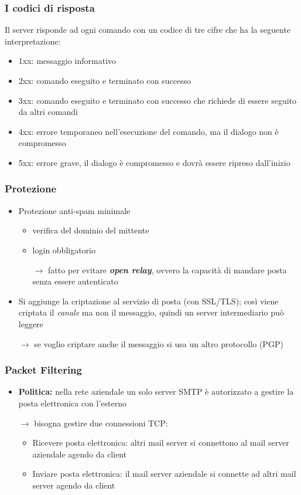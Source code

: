\subsubsection{I codici di risposta}
Il server risponde ad ogni comando con un codice di tre cifre che ha la 
seguente interpretazione:
\begin{itemize}
    \item 1xx: messaggio informativo
    \item 2xx: comando eseguito e terminato con successo 
    \item 3xx: comando eseguito e terminato con successo che richiede di essere 
    seguito da altri comandi 
    \item 4xx: errore temporaneo nell'esecuzione del comando, ma il dialogo non è compromesso 
    \item 5xx: errore grave, il dialogo è compromesso e dovrà essere ripreso dall'inizio
\end{itemize}

\subsubsection{Protezione}
\begin{itemize}
    \item Protezione anti-spam minimale
    \begin{itemize}
        \item verifica del dominio del mittente 
        \item login obbligatorio
        
        $\rightarrow$ fatto per evitare \textbf{\textit{open relay}}, ovvero la capacità di mandare posta 
        senza essere autenticato 
    \end{itemize}
    \item Si aggiunge la criptazione al servizio di posta (con SSL/TLS); così viene criptata 
    il \textit{canale} ma non il messaggio, quindi un server intermediario può leggere 

    $\rightarrow$ se voglio criptare anche il messaggio si usa un altro protocollo (PGP)
\end{itemize}

\subsubsection{Packet Filtering}
\begin{itemize}
    \item \textbf{Politica:} nella rete aziendale un solo server SMTP è autorizzato 
    a gestire la posta elettronica con l'esterno 
    
    $\rightarrow$ bisogna gestire due connessioni TCP:
    \begin{itemize}
        \item Ricevere posta elettronica: altri mail server si connettono al mail server aziendale agendo da client 
        \item Inviare posta elettronica: il mail server aziendale si connette ad altri mail server agendo da client
    \end{itemize}
\end{itemize}

